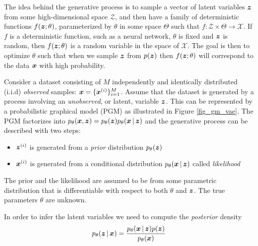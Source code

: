 

The idea behind the generative process is to sample a vector of latent variables $\boldsymbol{z}$ from some high-dimensional space $\mathcal{Z}$, and then have a family of deterministic functions $f(\boldsymbol{z};\theta)$, parameterized by $\theta$ in some space $\Theta$ such that $f: \mathcal{Z} \times \Theta \rightarrow \mathcal{X}$. If $f$ is a deterministic function, such as a neural network, $\theta$ is fixed and $\boldsymbol{z}$ is random, then $f(\boldsymbol{z};\theta)$ is a random variable in the space of $\mathcal{X}$. The goal is then to optimize $\theta$ such that when we sample $\boldsymbol{z}$ from $p(\boldsymbol{z})$ then $f(\boldsymbol{z};\theta)$ will correspond to the data $\boldsymbol{x}$ with high probability.

Consider a dataset consisting of $M$ independently and identically distributed (i.i.d) \textit{observed} samples: $\boldsymbol{x} = \{\boldsymbol{x}^{(i)}\}^M_{i=1}$. Assume that the dataset is generated by a process involving an \textit{unobserved}, or latent, variable $\boldsymbol{z}$. This can be represented by a probabilistic graphical model (PGM) as illustrated in Figure \ref{fig_gm_vae}. The PGM factorizes into $\ptheta (\vx, \vz) = \ptheta (\vz) \ptheta \given{\vx}{\vz}$ and the generative process can be described with two steps:

\begin{itemize}
    \item $\boldsymbol{z}^{(i)}$ is generated from a \textit{prior} distribution $p_{\theta}(\boldsymbol{z})$
    \item $\boldsymbol{x}^{(i)}$ is generated from a conditional distribution $p_{\theta}\given{\vx}{\vz}$ called \textit{likelihood}
\end{itemize}
%
The prior and the likelihood are assumed to be from some parametric distribution that is differentiable with respect to both $\theta$ and $\boldsymbol{z}$. The true parameters $\theta$ are unknown.

In order to infer the latent variables we need to compute the \textit{posterior} density
\begin{equation}
p_{\theta}\given{\vz}{\vx} = \frac{p_{\theta}\given{\vx}{\vz}p(\vz)}{p_{\theta}(\vx)}
\end{equation}

